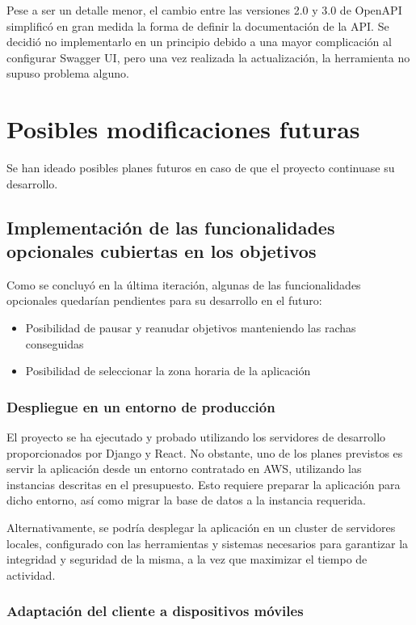 \documentclass[10pt, a4paper]{aqademic}
\begin{document}
Pese a ser un detalle menor, el cambio entre las versiones 2.0 y 3.0 de OpenAPI simplificó en gran medida la forma de definir la documentación de la API. Se decidió no implementarlo en un principio debido a una mayor complicación al configurar Swagger UI, pero una vez realizada la actualización, la herramienta no supuso problema alguno.


\section{Posibles modificaciones futuras}

Se han ideado posibles planes futuros en caso de que el proyecto continuase su desarrollo.

\subsection*{Implementación de las funcionalidades opcionales cubiertas en los objetivos}

Como se concluyó en la última iteración, algunas de las funcionalidades opcionales quedarían pendientes para su desarrollo en el futuro:

\begin{itemize}
	\item Posibilidad de pausar y reanudar objetivos manteniendo las rachas conseguidas
	\item Posibilidad de seleccionar la zona horaria de la aplicación
\end{itemize}


\subsubsection*{Despliegue en un entorno de producción}

El proyecto se ha ejecutado y probado utilizando los servidores de desarrollo proporcionados por Django y React. No obstante, uno de los planes previstos es 
servir la aplicación desde un entorno contratado en AWS, utilizando las instancias descritas en el presupuesto. Esto requiere preparar la aplicación para dicho entorno, así como migrar la base de datos a la instancia requerida.

Alternativamente, se podría desplegar la aplicación en un cluster de servidores locales, configurado con las herramientas y sistemas necesarios para garantizar la integridad y seguridad de la misma, a la vez que maximizar el tiempo de actividad.


\subsubsection*{Adaptación del cliente a dispositivos móviles}
\end{document}
